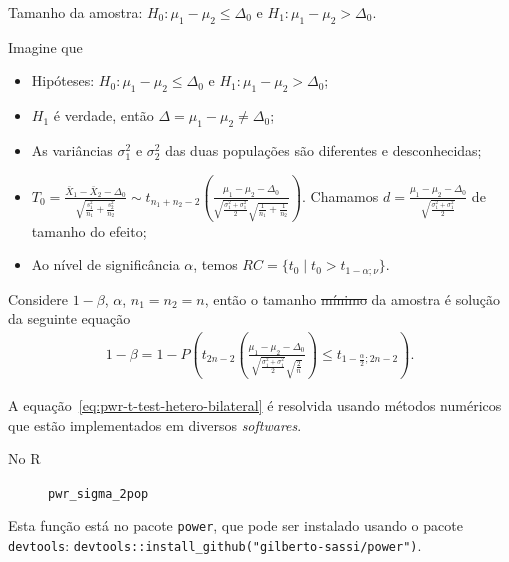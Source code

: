 \documentclass[9pt]{beamer}
\begin{document}
\begin{frame}[fragile]{Tamanho da amostra: $H_0:\mu_1 - \mu_2 \leq \Delta_0$ e $H_1: \mu_1 - \mu_2 > \Delta_0$.}

\footnotesize

Imagine que
\begin{itemize}
	\item Hipóteses: $H_0: \mu_1 - \mu_2 \leq \Delta_0$ e $H_1: \mu_1 -  \mu_2 > \Delta_0$;
	\item $H_1$ é verdade, então $\Delta = \mu_1-\mu_2 \neq \Delta_0$;
	\item As variâncias $\sigma_1^2$  e $\sigma_2^2$ das duas populações são diferentes e desconhecidas;
	\item $T_0 = \frac{\bar{X}_1 - \bar{X}_2 - \Delta_0}{ \sqrt{ \frac{s_1^2}{n_1} + \frac{s_2^2}{n_2} } } \sim t_{n_1+n_2-2}\left( \frac{\mu_1 - \mu_2 - \Delta_0}{\sqrt{\frac{\sigma_1^2 + \sigma_1^2}{2}} \sqrt{\frac{1}{n_1} + \frac{1}{n_2}}} \right)$. Chamamos $d = \frac{\mu_1 - \mu_2 - \Delta_0}{\sqrt{\frac{\sigma_1^2 + \sigma_1^2}{2}}}$ de tamanho do efeito;
	\item Ao nível de significância $\alpha$, temos $RC = \{ t_0 \mid t_0 > t_{1-\alpha;\nu} \}$.
\end{itemize}
\vfill

Considere $1-\beta$, $\alpha$, $n_1=n_2=n$, então o tamanho \sout{mínimo} da amostra é solução da seguinte equação
\scriptsize
\begin{align}\label{eq:pwr-t-test-hetero-greater}
1-\beta = 1 - P\left( t_{2n-2}\left( \frac{ \mu_1 - \mu_2 - \Delta_0 }{\sqrt{\frac{\sigma_1^2 + \sigma_1^2}{2}} \sqrt{\frac{2}{n}}} \right) \leq t_{1-\frac{\alpha}{2};2n-2} \right).
\end{align}

A equação~\eqref{eq:pwr-t-test-hetero-bilateral} é resolvida usando métodos numéricos que estão implementados em diversos \textit{softwares}.
\begin{description}
	\item[No R] \lstinline|pwr_sigma_2pop|
\end{description}
Esta função está no pacote \lstinline|power|, que pode ser instalado usando o pacote \lstinline|devtools|: \lstinline|devtools::install_github("gilberto-sassi/power")|.

\normalsize
\end{frame}
\end{document}
